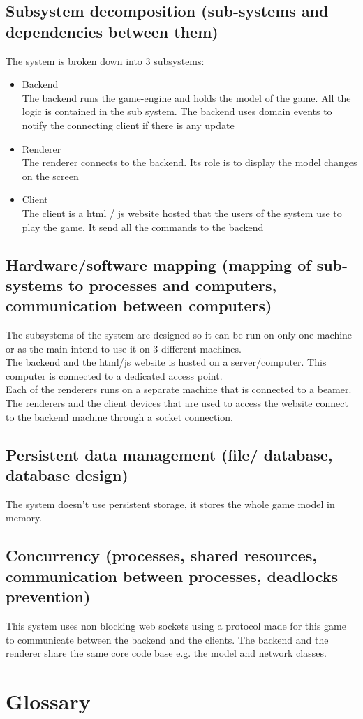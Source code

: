\documentclass[11pt,a4paper]{article}
\begin{document}
\subsection{Subsystem decomposition (sub-systems and dependencies between them)}
The system is broken down into 3 subsystems:
\begin{itemize}
\item
Backend
\\
The backend runs the game-engine and holds the model of the game. All the logic is contained in the sub system. The backend uses domain events to notify the connecting client if there is any update
\item
Renderer
\\
The renderer connects to the backend. Its role is to display the model changes on the screen
\item
Client
\\
The client is a html / js website hosted that the users of the system use to play the game. It send all the commands to the backend
\end{itemize}

\subsection{Hardware/software mapping (mapping of sub-systems to processes and computers, communication between computers)}

The subsystems of the system are designed so it can be run on only one machine or as the main intend to use it on 3 different machines.
\\
The backend and the html/js website is hosted on a server/computer. This computer is connected to a dedicated access point. 
\\
Each of the renderers runs on a separate machine that is connected to a beamer.
\\
The renderers and the client devices that are used to access the website connect to the backend machine through a socket connection.


\subsection{Persistent data management (file/ database, database design)}
The system doesn't use persistent storage, it stores the whole game model in memory.

\subsection{Concurrency (processes, shared resources, communication between processes, deadlocks prevention)}
This system uses non blocking web sockets using a protocol made for this game to communicate between the backend and the clients. The backend and the renderer share the same core code base e.g. the model and network classes. 


\section{Glossary}
\end{document}
